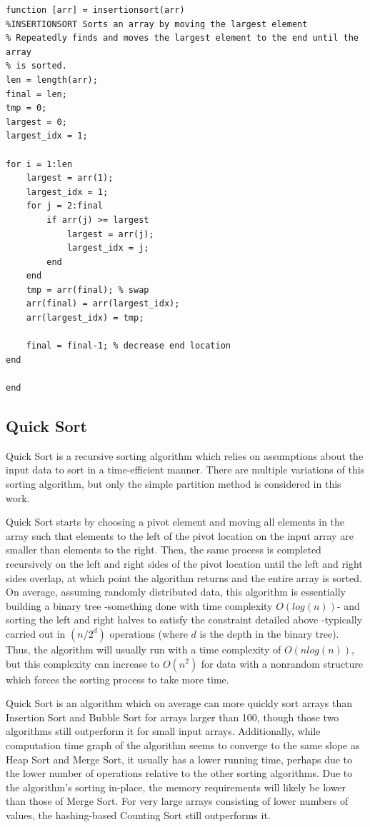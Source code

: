\documentclass[a4paper]{article}
\begin{document}
\begin{lstlisting}
function [arr] = insertionsort(arr)
%INSERTIONSORT Sorts an array by moving the largest element
% Repeatedly finds and moves the largest element to the end until the array
% is sorted.
len = length(arr);
final = len;
tmp = 0;
largest = 0;
largest_idx = 1;

for i = 1:len
    largest = arr(1);
    largest_idx = 1;
    for j = 2:final
        if arr(j) >= largest
            largest = arr(j);
            largest_idx = j;
        end
    end
    tmp = arr(final); % swap
    arr(final) = arr(largest_idx);
    arr(largest_idx) = tmp;
    
    final = final-1; % decrease end location
end

end

\end{lstlisting}

\subsection{Quick Sort}
Quick Sort is a recursive sorting algorithm which relies on assumptions about the input data to sort in a time-efficient manner. There are multiple variations of this sorting algorithm, but only the simple partition method is considered in this work.

Quick Sort starts by choosing a pivot element and moving all elements in the array such that elements to the left of the pivot location on the input array are smaller than elements to the right. Then, the same process is completed recursively on the left and right sides of the pivot location until the left and right sides overlap, at which point the algorithm returns and the entire array is sorted. On average, assuming randomly distributed data, this algorithm is essentially building a binary tree -something done with time complexity $O(log(n))$- and sorting the left and right halves to satisfy the constraint detailed above -typically carried out in $(n/2^d)$ operations (where $d$ is the depth in the binary tree). Thus, the algorithm will usually run with a time complexity of $O(nlog(n))$, but this complexity can increase to $O(n^2)$ for data with a nonrandom structure which forces the sorting process to take more time.

Quick Sort is an algorithm which on average can more quickly sort arrays than Insertion Sort and Bubble Sort for arrays larger than 100, though those two algorithms still outperform it for small input arrays. Additionally, while computation time graph of the algorithm seems to converge to the same slope as Heap Sort and Merge Sort, it usually has a lower running time, perhaps due to the lower number of operations relative to the other sorting algorithms. Due to the algorithm’s sorting in-place, the memory requirements will likely be lower than those of Merge Sort. For very large arrays consisting of lower numbers of values, the hashing-based Counting Sort still outperforms it.
\end{document}
